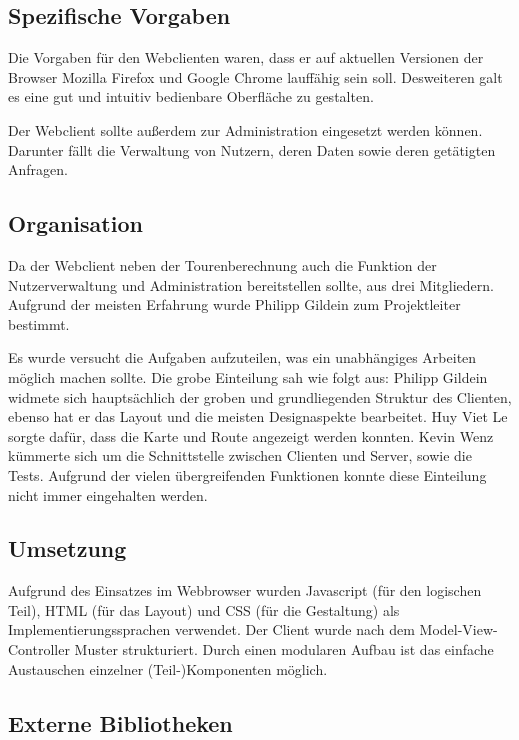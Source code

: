 \subsection*{Spezifische Vorgaben}

Die Vorgaben für den Webclienten waren, dass er auf aktuellen Versionen der Browser Mozilla Firefox und Google Chrome lauffähig sein soll.
Desweiteren galt es eine gut und intuitiv bedienbare Oberfläche zu gestalten.

Der Webclient sollte außerdem zur Administration eingesetzt werden können.
Darunter fällt die Verwaltung von Nutzern, deren Daten sowie deren getätigten Anfragen.

\subsection*{Organisation}

Da der Webclient neben der Tourenberechnung auch die Funktion der Nutzerverwaltung und Administration bereitstellen sollte, aus drei Mitgliedern. 
Aufgrund der meisten Erfahrung wurde Philipp Gildein zum Projektleiter bestimmt.

Es wurde versucht die Aufgaben aufzuteilen, was ein unabhängiges Arbeiten möglich machen sollte.
Die grobe Einteilung sah wie folgt aus: Philipp Gildein widmete sich hauptsächlich der groben und grundliegenden Struktur des Clienten, ebenso hat er das Layout und die meisten Designaspekte bearbeitet.
Huy Viet Le sorgte dafür, dass die Karte und Route angezeigt werden konnten.
Kevin Wenz kümmerte sich um die Schnittstelle zwischen Clienten und Server, sowie die Tests.
Aufgrund der vielen übergreifenden Funktionen konnte diese Einteilung nicht immer eingehalten werden.

\subsection*{Umsetzung}

Aufgrund des Einsatzes im Webbrowser wurden Javascript (für den logischen Teil), HTML (für das Layout) und CSS (für die Gestaltung) als Implementierungssprachen verwendet.
Der Client wurde nach dem Model-View-Controller Muster strukturiert. 
Durch einen modularen Aufbau ist das einfache Austauschen einzelner (Teil-)Komponenten möglich.

\subsection*{Externe Bibliotheken}


